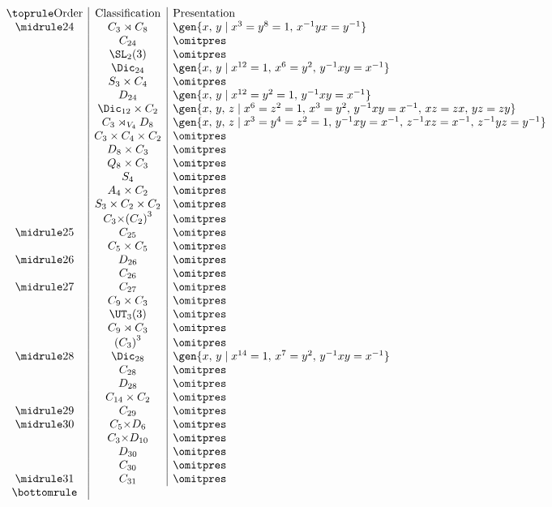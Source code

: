 \begin{displaymath}
\begin{array}{c|c|l}
\toprule
\text{Order} & \text{Classification} & \text{Presentation} \\
\midrule
24 & C_3 \rtimes C_8 & \gen{x,\,y \mid x^3 = y^8 = 1,\, x^{-1}yx = y^{-1}} \\
   & C_{24} & {\omitpres} \\
   & \SL_2(3) & {\omitpres} \\
   & \Dic_{24} & \gen{x,\,y \mid x^{12} = 1,\, x^6 = y^2,\, y^{-1}xy = x^{-1}} \\
   & S_3 \times C_4 & {\omitpres} \\
   & D_{24} & \gen{x,\,y \mid x^{12} = y^2 = 1,\, y^{-1}xy = x^{-1}} \\
   & \Dic_{12} \times C_2 & \gen{x,\,y,\,z \mid x^6 = z^2 = 1,\, x^3 = y^2,\, y^{-1}xy = x^{-1},\, xz = zx,\, yz = zy} \\
   & C_3 \rtimes_{V_4} D_8 & \gen{x,\,y,\,z \mid x^3 = y^4 = z^2 = 1,\, y^{-1}xy = x^{-1},\, z^{-1}xz = x^{-1},\, z^{-1}yz = y^{-1}} \\
   & C_3 \times C_4 \times C_2 & {\omitpres} \\
   & D_8 \times C_3 & {\omitpres} \\
   & Q_8 \times C_3 & {\omitpres} \\
   & S_4 & {\omitpres} \\
   & A_4 \times C_2 & {\omitpres} \\
   & S_3 \times C_2 \times C_2 & {\omitpres} \\
   & C_3 {\times} {(C_2)}^3 & {\omitpres} \\
\midrule
25 & C_{25} & {\omitpres} \\
   & C_5 \times C_5 & {\omitpres} \\
\midrule
26 & D_{26} & {\omitpres} \\
   & C_{26} & {\omitpres} \\
\midrule
27 & C_{27} & {\omitpres} \\
   & C_9 \times C_3 & {\omitpres} \\
   & \UT_3(3) & {\omitpres} \\
   & C_9 \rtimes C_3 & {\omitpres} \\
   & {(C_3)}^3 & {\omitpres} \\
\midrule
28 & \Dic_{28} & \gen{x,\,y \mid x^{14} = 1,\, x^7 = y^2,\, y^{-1}xy = x^{-1}} \\
   & C_{28} & {\omitpres} \\
   & D_{28} & {\omitpres} \\
   & C_{14} \times C_2 & {\omitpres} \\
\midrule
29 & C_{29} & {\omitpres} \\
\midrule
30 & C_5 {\times} D_6 & {\omitpres} \\
   & C_3 {\times} D_{10} & {\omitpres} \\
   & D_{30} & {\omitpres} \\
   & C_{30} & {\omitpres}\\
\midrule
31 & C_{31} & {\omitpres} \\
\bottomrule
\end{array}
\end{displaymath}
